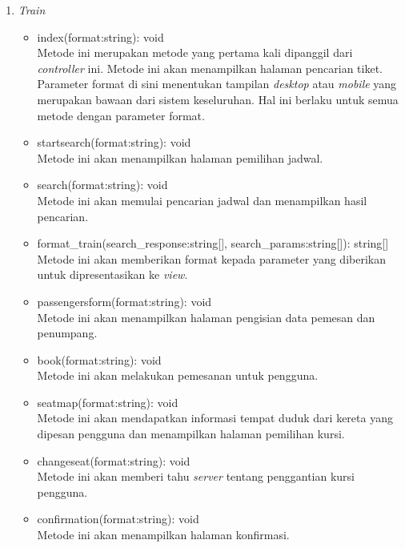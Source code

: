 \begin{enumerate}
    \item \textit{Train}
     \begin{itemize}
         \item index(format:string): void\\
         Metode ini merupakan metode yang pertama kali dipanggil dari \textit{controller} ini. Metode ini akan menampilkan halaman pencarian tiket. Parameter format di sini menentukan tampilan \textit{desktop} atau \textit{mobile} yang merupakan bawaan dari sistem keseluruhan. Hal ini berlaku untuk semua metode dengan parameter format.

        \item startsearch(format:string): void\\
        Metode ini akan menampilkan halaman pemilihan jadwal.
        
        \item search(format:string): void\\
        Metode ini akan memulai pencarian jadwal dan menampilkan hasil pencarian.
        
        \item format\_train(search\_response:string[], search\_params:string[]): string[]\\
        Metode ini akan memberikan format kepada parameter yang diberikan untuk dipresentasikan ke \textit{view}.
        
        \item passengersform(format:string): void\\
        Metode ini akan menampilkan halaman pengisian data pemesan dan penumpang.
        
        \item book(format:string): void\\
        Metode ini akan melakukan pemesanan untuk pengguna.
        
        \item seatmap(format:string): void\\
        Metode ini akan mendapatkan informasi tempat duduk dari kereta yang dipesan pengguna dan menampilkan halaman pemilihan kursi.
        
        \item changeseat(format:string): void\\
        Metode ini akan memberi tahu \textit{server} tentang penggantian kursi pengguna.
        
        \item confirmation(format:string): void\\
        Metode ini akan menampilkan halaman konfirmasi.
        

\end{itemize}
\end{enumerate}

